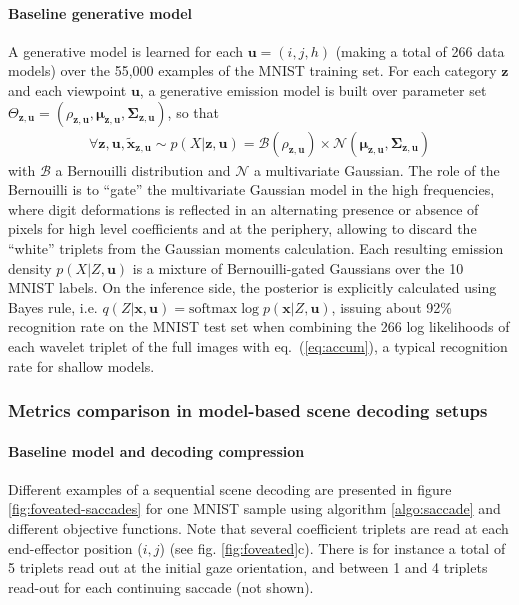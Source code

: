\documentclass[12pt,twoside,openright]{article}
\begin{document}
\paragraph{Baseline generative model}
A generative model is learned for each $\boldsymbol{u} = (i,j,h)$ (making a total of 266 data models) over the 55,000 examples of the MNIST training set. For each category $\boldsymbol{z}$ and each viewpoint $\boldsymbol{u}$, a generative {\color{Purple} emission} model is built over parameter set $\Theta_{\boldsymbol{z},\boldsymbol{u}} = (\rho_{\boldsymbol{z},\boldsymbol{u}}, \boldsymbol{\mu}_{\boldsymbol{z},\boldsymbol{u}}, \boldsymbol{\Sigma}_{\boldsymbol{z},\boldsymbol{u}})$, so that 
\begin{align}
\forall \boldsymbol{z},\boldsymbol{u}, \tilde{\boldsymbol{x}}_{\boldsymbol{z},\boldsymbol{u}} \sim
p(X|\boldsymbol{z},\boldsymbol{u}) =  \mathcal{B}(\rho_{\boldsymbol{z},\boldsymbol{u}}) \times \mathcal{N}(\boldsymbol{\mu}_{\boldsymbol{z},\boldsymbol{u}}, \boldsymbol{\Sigma}_{\boldsymbol{z},\boldsymbol{u}})\label{eq:bernouilli-gated}
\end{align} 
with $\mathcal{B}$ a Bernouilli distribution and $\mathcal{N}$ a multivariate Gaussian. The role of the Bernouilli is to ``gate'' the multivariate Gaussian model in the high frequencies, where digit deformations is reflected in an alternating presence or absence of pixels for high level coefficients and at the periphery, allowing to discard the ``white'' triplets from the Gaussian moments calculation. Each resulting emission density $p(X|Z,\boldsymbol{u})$ is a mixture of Bernouilli-gated Gaussians over the 10 MNIST labels. On the {\color{Purple}inference} side, the posterior is explicitly calculated using Bayes rule, i.e. $q(Z|\boldsymbol{x},\boldsymbol{u}) = \text{softmax} \log p(\boldsymbol{x}|Z,\boldsymbol{u})$, issuing about 92\% recognition rate on the MNIST test set when combining the 266 log likelihoods of each wavelet triplet of the full images with eq.~(\ref{eq:accum}), a typical recognition rate for shallow models.

\subsubsection{Metrics comparison in model-based scene decoding setups}

\paragraph{Baseline model and decoding compression}
Different examples of a sequential scene decoding are presented in figure \ref{fig:foveated-saccades} for one MNIST sample using algorithm \ref{algo:saccade} and different objective functions.
Note that several coefficient triplets are read at each end-effector position ($i,j$) (see fig. \ref{fig:foveated}c). There is for instance a total of 5 triplets read out at the initial gaze orientation, and between 1 and 4 triplets read-out for each continuing saccade (not shown). 
\end{document}
